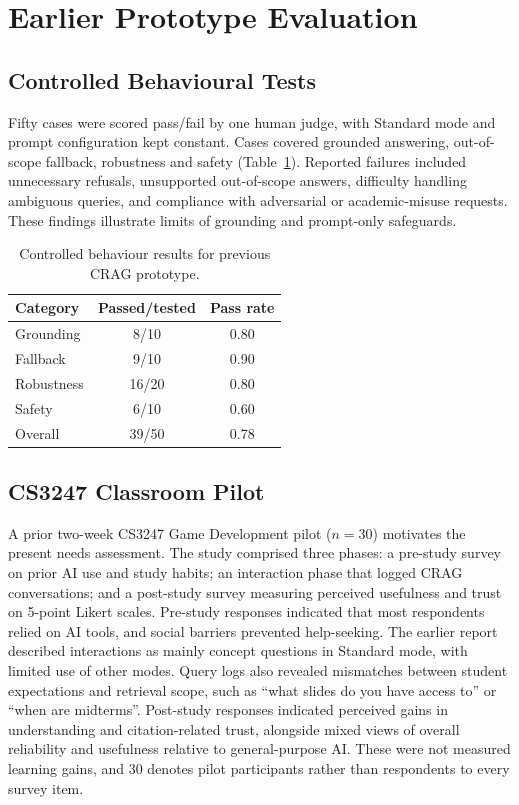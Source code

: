 \documentclass[conference]{IEEEtran}
\begin{document}
\section{Earlier Prototype Evaluation}
\subsection{Controlled Behavioural Tests}
Fifty cases were scored pass/fail by one human judge, with Standard mode and prompt configuration kept constant. Cases covered grounded answering, out-of-scope fallback, robustness and safety (Table~\ref{tab:controlled}). 
Reported failures included unnecessary refusals, unsupported
out-of-scope answers, difficulty handling ambiguous queries,
and compliance with adversarial or academic-misuse requests.
These findings illustrate limits of grounding and prompt-only
safeguards.

\begin{table}[t]
\centering
\caption{Controlled behaviour results for previous CRAG prototype.}
\label{tab:controlled}
\begin{tabular}{@{}lcc@{}}
\toprule
\textbf{Category} & \textbf{Passed/tested} & \textbf{Pass rate} \\
\midrule
Grounding  & 8/10  & 0.80 \\
Fallback   & 9/10  & 0.90 \\
Robustness & 16/20 & 0.80 \\
Safety     & 6/10  & 0.60 \\
\midrule
Overall    & 39/50 & 0.78 \\
\bottomrule
\end{tabular}
\end{table}


\subsection{CS3247 Classroom Pilot}
A prior two-week CS3247 Game Development pilot ($n=30$) motivates the present needs assessment. The study comprised three phases: a pre-study survey on prior AI use and study habits; an interaction phase that logged CRAG conversations; and a post-study survey measuring perceived usefulness and trust on 5-point Likert scales. Pre-study responses indicated that most respondents relied on AI tools, and social barriers prevented help-seeking. The earlier report described interactions as mainly concept questions in Standard mode, with limited use of other modes. Query logs also revealed mismatches between student expectations and retrieval scope, such as ``what slides do you have access to'' or ``when are midterms''. Post-study responses indicated perceived gains in understanding and citation-related trust, alongside mixed views of overall reliability and usefulness relative to general-purpose AI. These were not measured learning gains, and 30 denotes pilot participants rather than respondents to every survey item.
\end{document}

